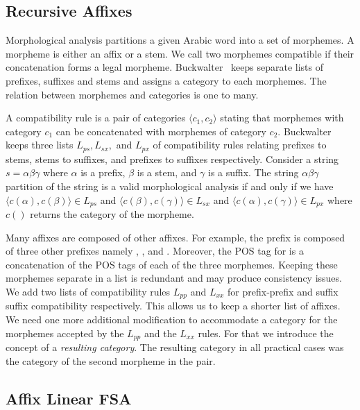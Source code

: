 \documentclass[11pt,letterpaper]{article}
\begin{document}
\subsection{Recursive Affixes}
\label{sec:recaffix}

Morphological analysis partitions a given Arabic word
into a set of morphemes.
A morpheme is either an affix or a stem. 
We call two morphemes compatible if their concatenation
forms a legal morpheme. 
Buckwalter~\cite{Buckwalter:02} keeps separate lists 
of prefixes, suffixes and stems and assigns a category
to each morphemes. 
The relation between morphemes and categories is one 
to many. 

A compatibility rule is a pair of categories 
$\langle c_1, c_2\rangle$  stating that morphemes
with category $c_1$ can be concatenated with morphemes
of category $c_2$. 
Buckwalter keeps three lists $L_{ps}, L_{sx},$ and $L_{px}$ 
of compatibility rules relating
prefixes to stems, stems to suffixes, and prefixes to suffixes
respectively. 
Consider a string $s=\alpha\beta\gamma$ where $\alpha$ is 
a prefix, $\beta$ is a stem, and $\gamma$ is a suffix. 
The string $\alpha\beta\gamma$ partition of the string is a 
valid morphological analysis if  and only if we have
$\langle c(\alpha),c(\beta)\rangle \in L_{ps}$ and
$\langle c(\beta),c(\gamma)\rangle \in L_{sx}$ and
$\langle c(\alpha),c(\gamma)\rangle \in L_{px}$ where
$c()$ returns the category of the morpheme.

Many affixes are composed of other affixes. For example,
the prefix  is composed of three other prefixes
namely , , and .
Moreover, the POS tag for  is a concatenation
of the POS tags of each of the three morphemes. 
Keeping these morphemes separate in a list
is redundant and may produce consistency issues. 
We add two lists of compatibility rules $L_{pp}$ and
$L_{xx}$ for prefix-prefix and suffix suffix compatibility
respectively.
This allows us to keep a shorter list of affixes. 
We need one more additional modification to accommodate 
a category for the morphemes accepted by the $L_{pp}$
and the $L_{xx}$ rules. For that we introduce the concept
of a {\em resulting category}. 
The resulting category in all practical cases
was the category of the second morpheme in the pair. 

\subsection{Affix Linear FSA}
\label{sec:affixFSA}
\end{document}
